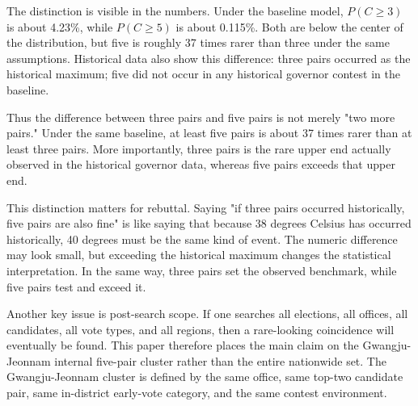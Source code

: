 \documentclass[preprint]{IEIE}
\begin{document}
The distinction is visible in the numbers. Under the baseline model, \(P(C \geq 3)\) is about 4.23\%, while \(P(C \geq 5)\) is about 0.115\%. Both are below the center of the distribution, but five is roughly 37 times rarer than three under the same assumptions. Historical data also show this difference: three pairs occurred as the historical maximum; five did not occur in any historical governor contest in the baseline.

\begin{center}
\scriptsize
{}
\end{center}

Thus the difference between three pairs and five pairs is not merely "two more pairs." Under the same baseline, at least five pairs is about 37 times rarer than at least three pairs. More importantly, three pairs is the rare upper end actually observed in the historical governor data, whereas five pairs exceeds that upper end.

This distinction matters for rebuttal. Saying "if three pairs occurred historically, five pairs are also fine" is like saying that because 38 degrees Celsius has occurred historically, 40 degrees must be the same kind of event. The numeric difference may look small, but exceeding the historical maximum changes the statistical interpretation. In the same way, three pairs set the observed benchmark, while five pairs test and exceed it.

Another key issue is post-search scope. If one searches all elections, all offices, all candidates, all vote types, and all regions, then a rare-looking coincidence will eventually be found. This paper therefore places the main claim on the Gwangju-Jeonnam internal five-pair cluster rather than the entire nationwide set. The Gwangju-Jeonnam cluster is defined by the same office, same top-two candidate pair, same in-district early-vote category, and the same contest environment.
\end{document}
